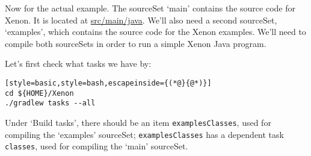 Now for the actual example. The sourceSet `main' contains the source code for Xenon. It is located at \url{src/main/java}. We'll also need a second sourceSet, `examples', which contains the source code for the Xenon examples. We'll need to compile both sourceSets in order to run a simple Xenon Java program.

Let's first check what tasks we have by:
\begin{lstlisting}[style=basic,style=bash,escapeinside={(*@}{@*)}]
cd ${HOME}/Xenon
./gradlew tasks --all
\end{lstlisting} %

Under `Build tasks', there should be an item \texttt{examplesClasses}, used for compiling the `examples' sourceSet; \texttt{examplesClasses} has a dependent task \texttt{classes}, used for compiling the `main' sourceSet.

